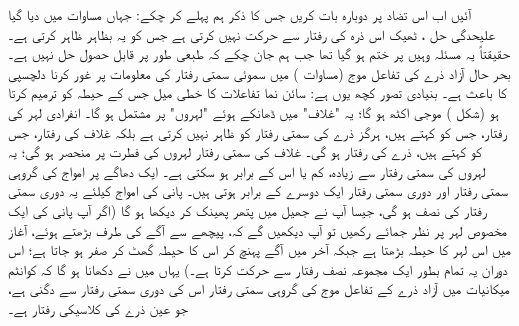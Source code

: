 آئیں اب اس تضاد پر دوبارہ بات کریں جس کا ذکر ہم پہلے کر چکے: جہاں مساوات  میں دیا گیا علیحدگی   حل ، ٹھیک اس ذرہ کی رفتار سے حرکت نہیں کرتی ہے جس کو یہ بظاہر ظاہر کرتی ہے۔ حقیقتاً  یہ مسئلہ وہیں پر ختم ہو گیا تھا جب ہم جان چکے کہ  طبعی طور پر قابل حصول حل نہیں ہے۔ بحر حال آزاد ذرے کی تفاعل موج (مساوات ) میں سموئی سمتی رفتار کی معلومات پر غور کرنا دلچسپی کا باعث ہے۔ بنیادی تصور کچھ یوں ہے: سائن نما تفاعلات کا خطی میل جس کے حیطہ کو  ترمیم کرتا ہو (شکل  )   موجی اکٹھ ہو گا؛ یہ "غلاف" میں ڈھانکے ہوئے "لہروں" پر مشتمل ہو گا۔ انفرادی لہر کی رفتار، جس کو     کہتے ہیں، ہرگز ذرے کی سمتی رفتار کو ظاہر نہیں کرتی ہے بلکہ غلاف کی رفتار، جس کو   کہتے ہیں، ذرے کی رفتار ہو گی۔ غلاف کی سمتی رفتار لہروں کی فطرت پر منحصر ہو گی؛  یہ لہروں کی سمتی رفتار سے زیادہ، کم یا اس کے برابر ہو سکتی  ہے۔ ایک دھاگے پر امواج کی گروہی سمتی رفتار اور دوری سمتی رفتار  ایک دوسرے کے برابر ہوتی ہیں۔ پانی کی امواج کیلئے یہ دوری سمتی رفتار کی نصف ہو گی، جیسا آپ نے جھیل میں پتھر پھینک کر دیکھا ہو گا (اگر آپ پانی کی ایک مخصوص لہر پر نظر جمائے رکھیں تو آپ دیکھیں گے کہ، پیچھے سے آگے کی طرف بڑھتے ہوئے، آغاز میں اس لہر کا حیطہ  بڑھتا ہے جبکہ آخر میں آگے پہنچ کر اس کا حیطہ گھٹ کر صفر ہو جاتا ہے؛ اس دوران یہ تمام بطور ایک مجموعہ  نصف رفتار سے حرکت کرتا ہے۔) یہاں میں نے دکھانا ہو گا کہ کوانٹم میکانیات میں آزاد ذرے کے تفاعل موج کی گروہی سمتی رفتار اس کی دوری سمتی رفتار سے دگنی ہے، جو عین ذرے کی کلاسیکی  رفتار ہے۔

